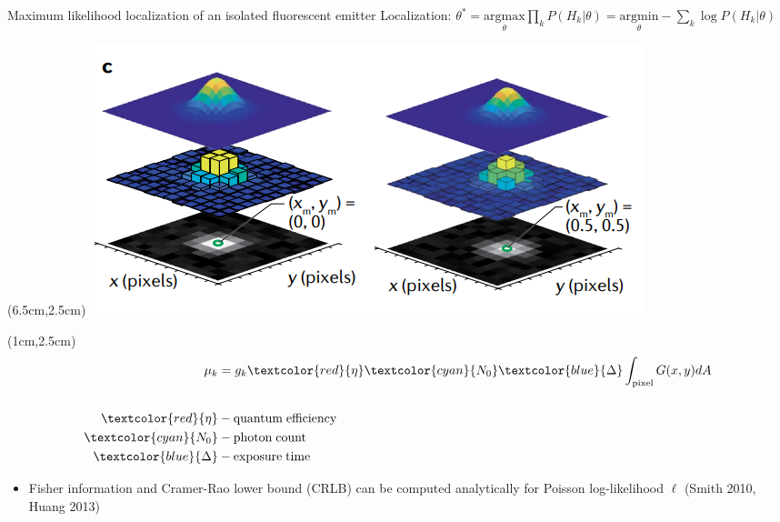 \documentclass{beamer}					%
\begin{document}
\begin{frame}{Maximum likelihood localization of an isolated fluorescent emitter}
Localization: $\theta^{*} = \underset{\theta}{\mathrm{argmax}}\prod_{k}P(H_{k}|\theta)= \underset{\theta}{\mathrm{argmin}}-\sum_{k}\log P(H_{k}|\theta)$

\begin{textblock*}{8cm}(6.5cm,2.5cm)
\includegraphics[width=\textwidth]{Model.png}
\end{textblock*}

\begin{textblock*}{2cm}(1cm,2.5cm)
\begin{align*}
\mu_{k} &= g_{k}\textcolor{red}{\eta} \textcolor{cyan}{N_{0}}\textcolor{blue}{\Delta}\int_{\mathrm{pixel}} G(x,y)dA\\
\\
\textcolor{red}{\eta} &- \mathrm{quantum\; efficiency}\\
\textcolor{cyan}{N_{0}} &- \mathrm{photon\; count}\\
\textcolor{blue}{\Delta} &- \mathrm{exposure\; time}
\end{align*}
\end{textblock*}


\vspace{2in}

\begin{itemize}
\item Fisher information and Cramer-Rao lower bound (CRLB) can be computed analytically for Poisson log-likelihood $\ell$ (Smith 2010, Huang 2013)
\end{itemize} 

\end{frame}
\end{document}
